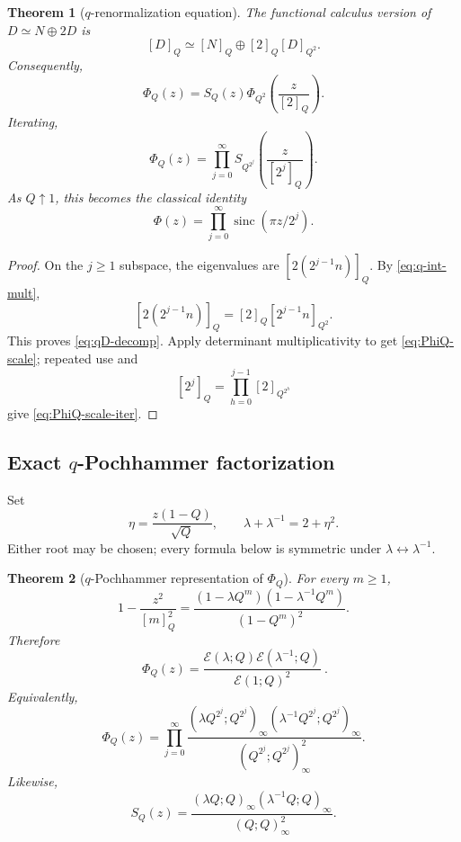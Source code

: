 \documentclass[11pt,oneside]{article}
\numberwithin{equation}{section}
\theoremstyle{plain}
\newtheorem{theorem}{Theorem}[section]
\theoremstyle{definition}
\theoremstyle{remark}
\newcommand{\sinc}{\operatorname{sinc}}
\newcommand{\Ecal}{\mathscr E}
\begin{document}
\begin{theorem}[$q$-renormalization equation]\label{thm:q-scaling}
The functional calculus version of $D\simeq N\oplus2D$ is
\begin{equation}\label{eq:qD-decomp}
 [D]_Q\simeq[N]_Q\oplus[2]_Q[D]_{Q^2}.
\end{equation}
Consequently,
\begin{equation}\label{eq:PhiQ-scale}
 \boxed{\ \Phi_Q(z)=S_Q(z)
 \Phi_{Q^2}\!\left(\frac{z}{[2]_Q}\right).\ }
\end{equation}
Iterating,
\begin{equation}\label{eq:PhiQ-scale-iter}
 \boxed{\ \Phi_Q(z)=\prod_{j=0}^{\infty}
 S_{Q^{2^j}}\!\left(\frac{z}{[2^j]_Q}\right).\ }
\end{equation}
As $Q\uparrow1$, this becomes the classical identity
\[
 \Phi(z)=\prod_{j=0}^{\infty}\sinc(\pi z/2^j).
\]
\end{theorem}

\begin{proof}
On the $j\ge1$ subspace, the eigenvalues are $[2(2^{j-1}n)]_Q$.  By \cref{eq:q-int-mult},
\[
 [2(2^{j-1}n)]_Q=[2]_Q[2^{j-1}n]_{Q^2}.
\]
This proves \cref{eq:qD-decomp}.  Apply determinant multiplicativity to get \cref{eq:PhiQ-scale}; repeated use and
\[
 [2^j]_Q=\prod_{h=0}^{j-1}[2]_{Q^{2^h}}
\]
give \cref{eq:PhiQ-scale-iter}.
\end{proof}

\subsection{Exact $q$-Pochhammer factorization}

Set
\begin{equation}\label{eq:eta-lambda}
 \eta=\frac{z(1-Q)}{\sqrt Q},
 \qquad
 \lambda+\lambda^{-1}=2+\eta^2.
\end{equation}
Either root may be chosen; every formula below is symmetric under $\lambda\leftrightarrow\lambda^{-1}$.

\begin{theorem}[$q$-Pochhammer representation of $\Phi_Q$]\label{thm:PhiQ-pch}
For every $m\ge1$,
\begin{equation}\label{eq:single-qfactor}
 1-\frac{z^2}{[m]_Q^2}
 =\frac{(1-\lambda Q^m)(1-\lambda^{-1}Q^m)}{(1-Q^m)^2}.
\end{equation}
Therefore
\begin{equation}\label{eq:PhiQ-E}
 \boxed{\ \Phi_Q(z)
 =\frac{\Ecal(\lambda;Q)\Ecal(\lambda^{-1};Q)}{\Ecal(1;Q)^2}\ }.
\end{equation}
Equivalently,
\begin{equation}\label{eq:PhiQ-tower}
 \Phi_Q(z)=\prod_{j=0}^{\infty}
 \frac{(\lambda Q^{2^j};Q^{2^j})_\infty
       (\lambda^{-1}Q^{2^j};Q^{2^j})_\infty}
      {(Q^{2^j};Q^{2^j})_\infty^2}.
\end{equation}
Likewise,
\begin{equation}\label{eq:SQ-pch}
 S_Q(z)=
 \frac{(\lambda Q;Q)_\infty(\lambda^{-1}Q;Q)_\infty}
      {(Q;Q)_\infty^2}.
\end{equation}
\end{theorem}
\end{document}
